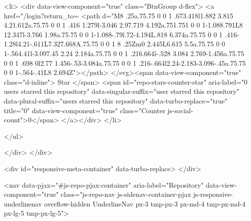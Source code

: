   <li>
        <div data-view-component="true" class="BtnGroup d-flex">
        <a href="/login?return_to=%
    <path d="M8 .25a.75.75 0 0 1 .673.418l1.882 3.815 4.21.612a.75.75 0 0 1 .416 1.279l-3.046 2.97.719 4.192a.751.751 0 0 1-1.088.791L8 12.347l-3.766 1.98a.75.75 0 0 1-1.088-.79l.72-4.194L.818 6.374a.75.75 0 0 1 .416-1.28l4.21-.611L7.327.668A.75.75 0 0 1 8 .25Zm0 2.445L6.615 5.5a.75.75 0 0 1-.564.41l-3.097.45 2.24 2.184a.75.75 0 0 1 .216.664l-.528 3.084 2.769-1.456a.75.75 0 0 1 .698 0l2.77 1.456-.53-3.084a.75.75 0 0 1 .216-.664l2.24-2.183-3.096-.45a.75.75 0 0 1-.564-.41L8 2.694Z"></path>
</svg><span data-view-component="true" class="d-inline">
          Star
</span>          <span id="repo-stars-counter-star" aria-label="0 users starred this repository" data-singular-suffix="user starred this repository" data-plural-suffix="users starred this repository" data-turbo-replace="true" title="0" data-view-component="true" class="Counter js-social-count">0</span>
</a></div>
  </li>

</ul>

        </div>
      </div>

        <div id="responsive-meta-container" data-turbo-replace>
</div>


          <nav data-pjax="#js-repo-pjax-container" aria-label="Repository" data-view-component="true" class="js-repo-nav js-sidenav-container-pjax js-responsive-underlinenav overflow-hidden UnderlineNav px-3 tmp-px-3 px-md-4 tmp-px-md-4 px-lg-5 tmp-px-lg-5">

